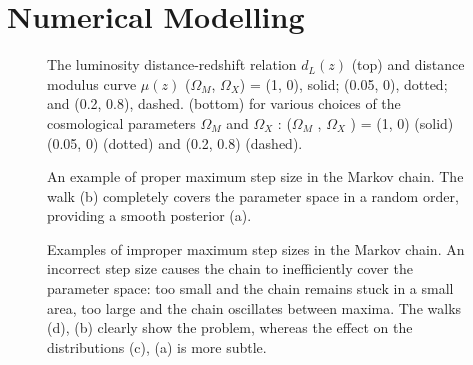 \chapter{Numerical Modelling}
\label{ch:numerical-modelling}


\begin{figure}[htbp]
\centering

\hfill
{}

\medskip

\hfill
{}

\caption{The luminosity distance-redshift relation $d_L(z)$ (top) and distance modulus curve $\mu(z)$ ($\Omega_M$, $\Omega_X$) = (1, 0), solid; (0.05, 0), dotted; and (0.2, 0.8), dashed. (bottom) for various choices of the cosmological parameters $\Omega_M$ and $\Omega_X$ : ($\Omega_M$ , $\Omega_X$ ) = (1, 0) (solid) (0.05, 0) (dotted) and (0.2, 0.8) (dashed).}
\label{fig:4.1}
\end{figure}

\begin{figure}
    \centering
    \hfill
    \caption{An example of proper maximum step size in the Markov chain.  The walk (b) completely covers the parameter space in a random order, providing a smooth posterior (a).}
\label{fig:fig4.2}
\end{figure}


\begin{figure}
\centering

\hfill
{}

\medskip

\hfill
{}

\caption{Examples of improper maximum step sizes in the Markov chain. An incorrect step size causes the chain to inefficiently cover the parameter space: too small and the chain remains stuck in a small area, too large and the chain oscillates between maxima. The walks (d), (b) clearly show the problem, whereas the effect on the distributions (c), (a) is more subtle.}
\label{fig:4.3}
\end{figure}


